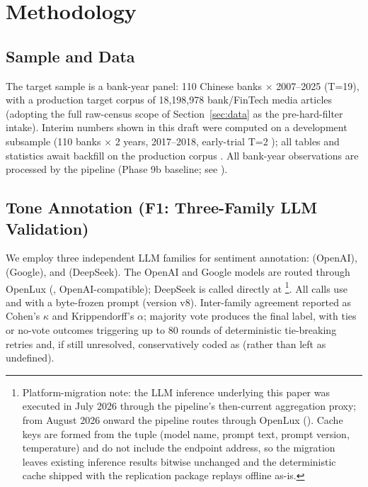 \section{Methodology}\label{sec:method}
\subsection{Sample and Data}
The target sample is a bank-year panel: 110 Chinese banks $\times$ 2007--2025 (T=19), with a
production target corpus of 18{,}198{,}978 bank/FinTech media articles (adopting the
full raw-census scope of Section~\ref{sec:data} as the pre-hard-filter intake).
Interim numbers shown in this draft were computed on a development subsample (110 banks
$\times$ 2 years, 2017--2018, early-trial T=2 ); all tables and statistics await backfill on the production
corpus . All bank-year observations are
processed by the  pipeline (Phase 9b baseline; see
).

\subsection{Tone Annotation (F1: Three-Family LLM Validation)}
We employ three independent LLM families for sentiment annotation:
 (OpenAI), 
(Google), and  (DeepSeek). The OpenAI and
Google models are routed through OpenLux (,
OpenAI-compatible); DeepSeek is called directly at
\footnote{Platform-migration note: the LLM inference underlying this
paper was executed in July 2026 through the pipeline's then-current
aggregation proxy; from August 2026 onward the pipeline routes through
OpenLux (). Cache keys are formed from
the tuple (model name, prompt text, prompt version, temperature) and do
not include the endpoint address, so the migration leaves existing
inference results bitwise unchanged and the deterministic cache shipped
with the replication package replays offline as-is.}. All calls use  and
 with a byte-frozen prompt (version v8). Inter-family agreement reported as
Cohen's $\kappa$ and Krippendorff's $\alpha$; majority vote produces the
final label, with ties or no-vote outcomes triggering up to 80 rounds of
deterministic tie-breaking retries and, if still unresolved, conservatively
coded as  (rather than left as undefined).

